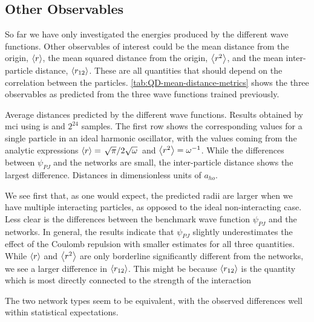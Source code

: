 \documentclass[Thesis.tex]{subfiles}
\begin{document}
\subsection{Other Observables}

So far we have only investigated the energies produced by the different wave
functions. Other observables of interest could be the mean distance from the origin,
$\expval{r}$, the mean squared distance from the origin, $\expval{r^2}$, and the mean
inter-particle distance, $\expval{r_{12}}$. These are all quantities that should
depend on the correlation between the particles.
\cref{tab:QD-mean-distance-metrics} shows the three observables as predicted
from the three wave functions trained previously.

\begin{table}[h]
  \centering
  \caption[Radial metrics of different wave functions on quantum dots]{Average distances predicted by the different wave functions. Results
    obtained by \gls{mci} using \gls{is} and $2^{24}$
    samples. The first row shows the corresponding values for a single particle
    in an ideal harmonic oscillator, with the values coming from the analytic
    expressions $\expval{r}=\flatfrac{\sqrt\pi}{2\sqrt\omega}$ and
    $\expval{r^2}=\omega^{-1}$. While the differences between $\psi_{PJ}$ and
    the networks are small, the inter-particle distance shows the largest
    difference. Distances in dimensionless units of $a_{ho}$.}
  
  \label{tab:QD-mean-distance-metrics}
\end{table}
We see first that, as one would expect, the predicted radii are larger when we
have multiple interacting particles, as opposed to the ideal non-interacting
case. Less clear is the differences between the benchmark wave function
$\psi_{PJ}$ and the networks. In general, the results
indicate that $\psi_{PJ}$ slightly underestimates the effect of the Coulomb
repulsion with smaller estimates for all three quantities. While $\expval{r}$
and $\expval{r^2}$ are only borderline significantly different from the networks, we see a
larger difference in $\expval{r_{12}}$. This might
be because $\expval{r_{12}}$ is the quantity which is most directly
connected to the strength of the interaction

The two network types seem to be equivalent, with the observed differences well
within statistical expectations.
\end{document}
